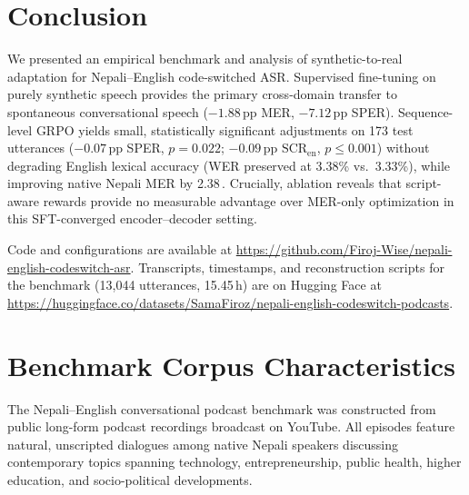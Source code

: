 \documentclass[10pt,twocolumn,a4paper]{article}
\newcommand{\pp}{\,\text{pp}}
\newcommand{\SCRen}{\text{SCR}_{\text{en}}}
\begin{document}
\section{Conclusion}
We presented an empirical benchmark and analysis of synthetic-to-real adaptation for Nepali--English code-switched ASR. Supervised fine-tuning on purely synthetic speech provides the primary cross-domain transfer to spontaneous conversational speech ($-1.88\pp$ MER, $-7.12\pp$ SPER). Sequence-level GRPO yields small, statistically significant adjustments on 173 test utterances ($-0.07\pp$ SPER, $p = 0.022$; $-0.09\pp$ $\SCRen$, $p \le 0.001$) without degrading English lexical accuracy (WER preserved at 3.38\% vs.\ 3.33\%), while improving native Nepali MER by 2.38\pp{}. Crucially, ablation reveals that script-aware rewards provide no measurable advantage over MER-only optimization in this SFT-converged encoder--decoder setting.

Code and configurations are available at \url{https://github.com/Firoj-Wise/nepali-english-codeswitch-asr}. Transcripts, timestamps, and reconstruction scripts for the benchmark (13,044 utterances, 15.45\,h) are on Hugging Face at \url{https://huggingface.co/datasets/SamaFiroz/nepali-english-codeswitch-podcasts}.


{
\fontsize{7.4pt}{8.6pt}\selectfont
\let\oldbibliography\thebibliography
\renewcommand{\thebibliography}[1]{%
  \oldbibliography{#1}%
  \setlength{\itemsep}{1.0pt}%
  \setlength{\parskip}{0pt}%
}

}

\appendix
\onecolumn
\normalsize
\raggedbottom
{}
\setlength{\parskip}{4pt plus 1pt minus 0.5pt}

\section{Benchmark Corpus Characteristics}
\label{sec:app_corpus}

The Nepali--English conversational podcast benchmark was constructed from public long-form podcast recordings broadcast on YouTube. All episodes feature natural, unscripted dialogues among native Nepali speakers discussing contemporary topics spanning technology, entrepreneurship, public health, higher education, and socio-political developments.
\end{document}
